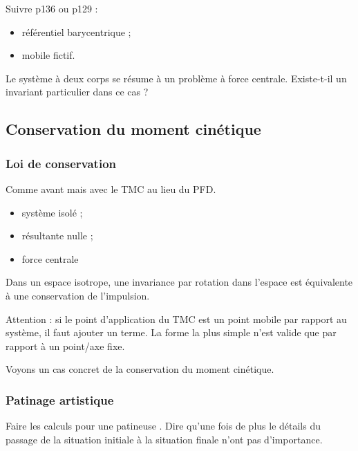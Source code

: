 Suivre \cite{Faroux1996} p136 ou \cite{Bocquet2002} p129 :
\begin{itemize}
\item référentiel barycentrique ;
\item mobile fictif.
\end{itemize}

\begin{transition}
Le système à deux corps se résume à un problème à force centrale.
Existe-t-il un invariant particulier dans ce cas ?
\end{transition}

\subsection{Conservation du moment cinétique}

\subsubsection{Loi de conservation}

Comme avant mais avec le TMC au lieu du PFD.
\begin{itemize}
\item système isolé ;
\item résultante nulle ;
\item force centrale
\end{itemize}

Dans un espace isotrope, une invariance par rotation dans l'espace est équivalente à une conservation de l'impulsion.

\begin{remarque}
Attention : si le point d'application du TMC est un point mobile par rapport au système, il faut ajouter un terme.
La forme la plus simple n'est valide que par rapport à un point/axe fixe.
\end{remarque}

\begin{transition}
Voyons un cas concret de la conservation du moment cinétique.
\end{transition}

\subsubsection{Patinage artistique}

Faire les calculs pour une patineuse \cite{Perez2014}.
Dire qu'une fois de plus le détails du passage de la situation initiale à la situation finale n'ont pas d'importance.

